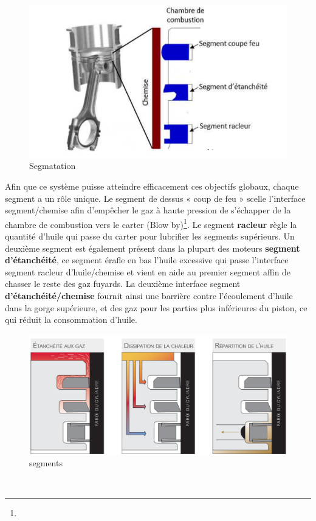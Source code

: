 \begin{figure}
	\centering
	\includegraphics[width=0.7\linewidth]{"Img/partie du segment"}
	\caption[Segmentation]{Segmatation}
	\label{fig:partie-du-segment}
\end{figure}


Afin que ce système puisse atteindre efficacement ces objectifs globaux, chaque segment a un rôle unique. Le segment de dessus « coup de feu » scelle l'interface segment/chemise afin d'empêcher le gaz à haute pression de s'échapper de la chambre de combustion vers le carter (Blow by)\footnote{ }. Le segment \textbf{racleur} règle la quantité d'huile qui passe du carter pour lubrifier les segments supérieurs. Un deuxième segment est également présent dans la plupart des moteurs \textbf{segment d’étanchéité}, ce segment érafle en bas l'huile excessive qui passe l'interface segment racleur d'huile/chemise et vient en aide au premier segment affin de chasser le reste des gaz fuyards. La deuxième interface segment \textbf{d’étanchéité/chemise} fournit ainsi une barrière contre l'écoulement d'huile dans la gorge supérieure, et des gaz pour les parties plus inférieures du piston, ce qui réduit la consommation d’huile. \cite{ayad1}
\begin{figure}[h]
	\centering
	\includegraphics[width=0.7\linewidth]{Img/fonction-segment}
	\caption[Segments]{segments}
	\label{fig:fonction-segment}
\end{figure}
\\

